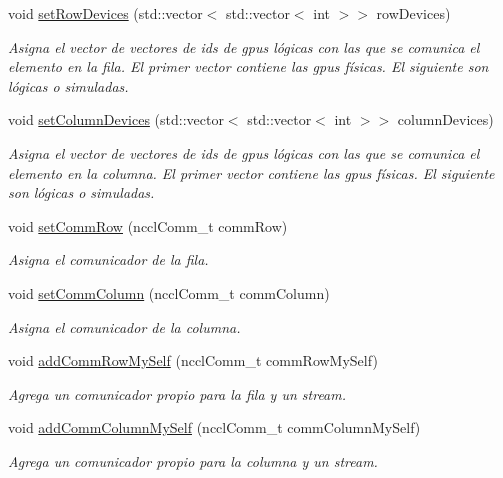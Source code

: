 \begin{DoxyCompactItemize}
void \hyperlink{classCommSummaElement_aede64abc22748c06ea085d804d97f685}{set\+Row\+Devices} (std\+::vector$<$ std\+::vector$<$ int $>$$>$ row\+Devices)
\begin{DoxyCompactList}\small\item\em Asigna el vector de vectores de ids de gpus lógicas con las que se comunica el elemento en la fila. El primer vector contiene las gpus físicas. El siguiente son lógicas o simuladas. \end{DoxyCompactList}\item 
void \hyperlink{classCommSummaElement_a0cf00376959a9d9af936eb43324b6b93}{set\+Column\+Devices} (std\+::vector$<$ std\+::vector$<$ int $>$$>$ column\+Devices)
\begin{DoxyCompactList}\small\item\em Asigna el vector de vectores de ids de gpus lógicas con las que se comunica el elemento en la columna. El primer vector contiene las gpus físicas. El siguiente son lógicas o simuladas. \end{DoxyCompactList}\item 
void \hyperlink{classCommSummaElement_af2efcc9649facbd8e82a0789266d7824}{set\+Comm\+Row} (nccl\+Comm\+\_\+t comm\+Row)
\begin{DoxyCompactList}\small\item\em Asigna el comunicador de la fila. \end{DoxyCompactList}\item 
void \hyperlink{classCommSummaElement_a310cc84521afa00836e53c1a36d78c1b}{set\+Comm\+Column} (nccl\+Comm\+\_\+t comm\+Column)
\begin{DoxyCompactList}\small\item\em Asigna el comunicador de la columna. \end{DoxyCompactList}\item 
void \hyperlink{classCommSummaElement_a06509976de567dcc04fe1ff58788437c}{add\+Comm\+Row\+My\+Self} (nccl\+Comm\+\_\+t comm\+Row\+My\+Self)
\begin{DoxyCompactList}\small\item\em Agrega un comunicador propio para la fila y un stream. \end{DoxyCompactList}\item 
void \hyperlink{classCommSummaElement_ab8f82547f8052685c111ee2999eba5a9}{add\+Comm\+Column\+My\+Self} (nccl\+Comm\+\_\+t comm\+Column\+My\+Self)
\begin{DoxyCompactList}\small\item\em Agrega un comunicador propio para la columna y un stream. \end{DoxyCompactList}\item 

\end{DoxyCompactItemize}
